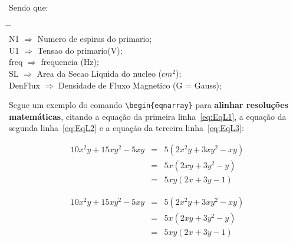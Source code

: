 \begin{Codigo}[language=tex, 
    caption=Sintaxe para adicionar Legendas alinhadas e com citações no Glossário, 
    label=cod:LegendaNumEsp]
Sendo que:\\
\begin{tabbing}
  \hspace{1cm}  \= \hspace{1cm} \= \kill \\
  \gls{N1}      \> $\Rightarrow$ \> Numero de espiras do 
                                    primario; \\
  \gls{U1}      \> $\Rightarrow$ \> Tensao do primario(V);\\
  \gls{freq}    \> $\Rightarrow$ \> frequencia (Hz); \\
  \gls{SL}      \> $\Rightarrow$ \> Area da Secao Liquida 
                                    do nucleo ($cm^2$); \\
  \gls{DenFlux} \> $\Rightarrow$ \> Densidade de Fluxo 
                                    Magnetico (G = Gauss); 
\end{tabbing}
\end{Codigo}

Segue um exemplo do comando \verb|\begin{eqnarray}| para {\bf alinhar resoluções matemáticas}, citando a equação da primeira linha~\ref{eq:EqL1}, a equação da segunda linha~\ref{eq:EqL2} e a equação da terceira linha~\ref{eq:EqL3}:

\begin{eqnarray}
    \label{eq:EqL1}
    10x^2y+15xy^2-5xy & = & 5(2x^2y+3xy^2-xy) \\    
    \label{eq:EqL2}
                      & = & 5x(2xy+3y^2-y) \\
    \label{eq:EqL3}
                      & = & 5xy(2x+3y-1)    
\end{eqnarray}

\begin{Codigo}[language=tex, 
    caption=Comando eqnarray com todas as equações numeradas, 
    label=cod:Eqnarray]
  \begin{eqnarray}
    \label{eq:EqL1}
    10x^2y+15xy^2-5xy & = & 5(2x^2y+3xy^2-xy) \\    
    \label{eq:EqL2}
                      & = & 5x(2xy+3y^2-y) \\
    \label{eq:EqL3}
                      & = & 5xy(2x+3y-1)    
  \end{eqnarray}
\end{Codigo}

